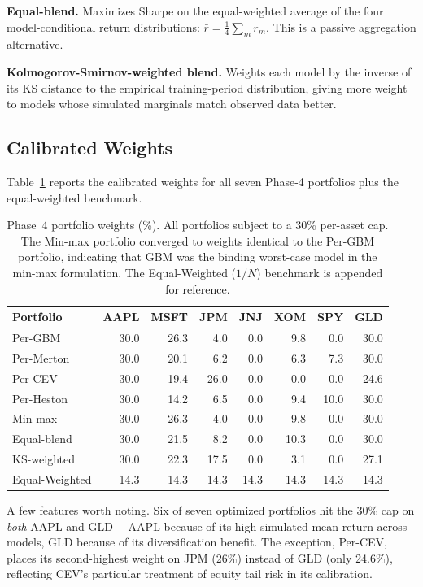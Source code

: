 \documentclass[11pt,letterpaper]{article}
\begin{document}
\textbf{Equal-blend.} Maximizes Sharpe on the equal-weighted average of the four model-conditional return distributions: $\bar{r} = \tfrac{1}{4}\sum_m r_m$. This is a passive aggregation alternative.

\textbf{Kolmogorov-Smirnov-weighted blend.} Weights each model by the inverse of its KS distance \citep{kolmogorov1933sulla} to the empirical training-period distribution, giving more weight to models whose simulated marginals match observed data better.

\subsection{Calibrated Weights}

Table~\ref{tab:phase4-weights} reports the calibrated weights for all seven Phase-4 portfolios plus the equal-weighted benchmark.

\begin{table}[h]
\centering
\caption{Phase~4 portfolio weights (\%). All portfolios subject to a 30\% per-asset cap. The Min-max portfolio converged to weights identical to the Per-GBM portfolio, indicating that GBM was the binding worst-case model in the min-max formulation. The Equal-Weighted ($1/N$) benchmark is appended for reference.}
\label{tab:phase4-weights}
\small
\begin{tabular}{lrrrrrrr}
\toprule
Portfolio & AAPL & MSFT & JPM & JNJ & XOM & SPY & GLD \\
\midrule
Per-GBM        & 30.0 & 26.3 &  4.0 &  0.0 &  9.8 &  0.0 & 30.0 \\
Per-Merton     & 30.0 & 20.1 &  6.2 &  0.0 &  6.3 &  7.3 & 30.0 \\
Per-CEV        & 30.0 & 19.4 & 26.0 &  0.0 &  0.0 &  0.0 & 24.6 \\
Per-Heston     & 30.0 & 14.2 &  6.5 &  0.0 &  9.4 & 10.0 & 30.0 \\
Min-max        & 30.0 & 26.3 &  4.0 &  0.0 &  9.8 &  0.0 & 30.0 \\
Equal-blend    & 30.0 & 21.5 &  8.2 &  0.0 & 10.3 &  0.0 & 30.0 \\
KS-weighted    & 30.0 & 22.3 & 17.5 &  0.0 &  3.1 &  0.0 & 27.1 \\
Equal-Weighted & 14.3 & 14.3 & 14.3 & 14.3 & 14.3 & 14.3 & 14.3 \\
\bottomrule
\end{tabular}
\end{table}

A few features worth noting. Six of seven optimized portfolios hit the 30\% cap on \emph{both} AAPL and GLD —AAPL because of its high simulated mean return across models, GLD because of its diversification benefit. The exception, Per-CEV, places its second-highest weight on JPM (26\%) instead of GLD (only 24.6\%), reflecting CEV's particular treatment of equity tail risk in its calibration.
\end{document}
